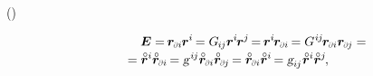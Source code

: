 \vspace{-0.2em}\noindent
{}  ~() 

\nopagebreak\vspace{-0.4em}\begin{multline*}
\shoveleft{ \hspace{3em} \UnitDyad
= \hspace{-0.2ex} \currentlocationvector_\differentialindex{i} \hspace{-0.1ex} \currentlocationvector^{i} \hspace{-0.2ex}
= G_{\hspace{-0.15ex}i\hspace{-0.1ex}j} \currentlocationvector^{i} \hspace{-0.2ex} \currentlocationvector^j \hspace{-0.25ex}
= \hspace{-0.2ex} \currentlocationvector^{i} \hspace{-0.2ex} \currentlocationvector_\differentialindex{i} \hspace{-0.2ex}
= G^{\hspace{.1ex}i\hspace{-0.1ex}j} \hspace{-0.2ex} \currentlocationvector_\differentialindex{i} \currentlocationvector_\differentialindex{\hspace{-0.1ex}j}
= \hfill }
\\[-0.2em]
= \initiallocationvector^i \initiallocationvector_\differentialindex{i} \hspace{-0.2ex}
= \textsl{g}^{\hspace{.2ex}i\hspace{-0.1ex}j} \initiallocationvector_\differentialindex{i} \initiallocationvector_\differentialindex{\hspace{-0.1ex}j} \hspace{-0.2ex}
= \initiallocationvector_\differentialindex{i} \initiallocationvector^i \hspace{-0.25ex}
= \textsl{g}_{i\hspace{-0.1ex}j} \hspace{.1ex} \initiallocationvector^i \initiallocationvector^j
\hspace{-0.2ex} ,
\end{multline*}


